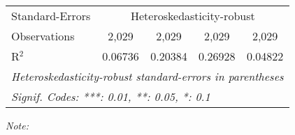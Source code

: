 \begin{table}[htbp!]
\begin{adjustbox}{width = 1\textwidth, max height = 0.95\textheight, center}
\begin{threeparttable}[b]
\begin{tabular}{lcccc}
            \midrule 
            Standard-Errors & \multicolumn{4}{c}{Heteroskedasticity-robust} \\ 
            Observations         & 2,029                          & 2,029                          & 2,029                           & 2,029\\  
            R$^2$                & 0.06736                        & 0.20384                        & 0.26928                         & 0.04822\\  
            \midrule \midrule
            \multicolumn{5}{l}{\emph{Heteroskedasticity-robust standard-errors in parentheses}}\\
            \multicolumn{5}{l}{\emph{Signif. Codes: ***: 0.01, **: 0.05, *: 0.1}}\\
         \end{tabular}
         
         \begin{tablenotes}\item \medskip \textit{Note:}
         \end{tablenotes}
      \end{threeparttable}
   \end{adjustbox}
\end{table}


